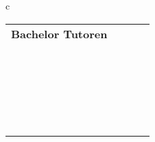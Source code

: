   \begin{tabular}{c}
\begin{tabular}{lll}
  { \textbf{Bachelor Tutoren}} \ \\ 
{
\npicture[0.3\linewidth]
{bilder/tutoren/dominik_pass}
{Dominik\\%
\randomize{d.schuermann@tu-bs.de}}
}%
& \ 
{\npicture[0.3\linewidth]
{bilder/tutoren/jan_germann.jpg}
{Jan\\%
\randomize{j.germann@tu-bs.de}}
} 
&\
{
\npicture[0.3\linewidth]
{bilder/tutoren/hf}
{Hella\\%
\randomize{h-f.hoffmann@tu-bs.de}}}
\\ \  \\
{\npicture[0.3\linewidth]
{bilder/tutoren/johannes.jpg}
{Johannes\\%
\randomize{J.Starosta@tu-bs.de}}
}& \ 

\end{tabular}
\end{tabular}
